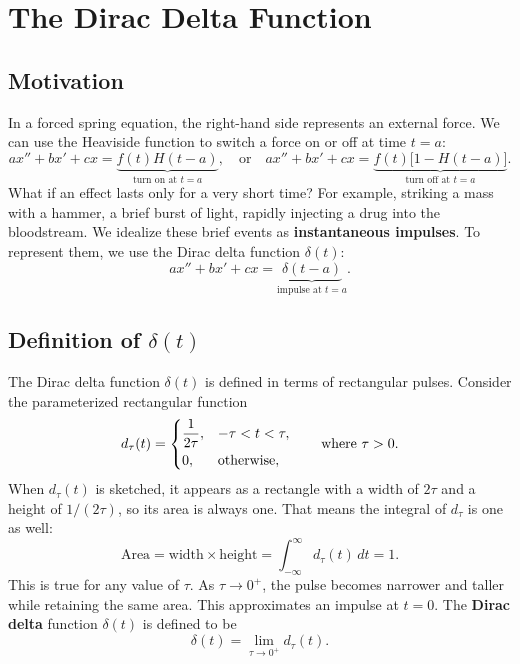 \documentclass[10pt,letterpaper]{article}
\begin{document}

\section{The Dirac Delta Function}

\subsection{Motivation}
In a forced spring equation, the right-hand side represents
an external force. We can use the Heaviside function to
switch a force on or off at time $t=a$:
\[
ax''+bx'+cx=
\underbrace{f(t)H(t-a)}_{\text{turn on at }t=a},
\quad \text{or}\quad
ax''+bx'+cx=
\underbrace{f(t)\bigl[1-H(t-a)\bigr]}_{\text{turn off at }t=a}.
\]
What if an effect lasts only for a very short time?
For example, striking a mass with a hammer, a brief burst of light, rapidly injecting a drug into the bloodstream. We idealize these brief events as
\textbf{instantaneous impulses}. To represent them,
we use the Dirac delta function $\delta(t)$:
\[
ax''+bx'+cx=
\underbrace{\delta(t-a)}_{\text{impulse at }t=a}.
\]

\subsection{Definition of $\delta(t)$}
The Dirac delta function $\delta(t)$ is defined in terms of rectangular pulses. Consider the parameterized rectangular function
\[
d_\tau(t)=
\begin{dcases}
\dfrac{1}{2\tau}, & -\tau<t<\tau,\\
0, & \text{otherwise},
\end{dcases}
\qquad \text{where }\tau>0.
\]
When $d_\tau(t)$ is sketched, it appears as a rectangle with a width of $2\tau$ and a height of $1/(2\tau)$, so its area is always one. That means the integral of $d_\tau$ is one as well:
\[\text{Area}=\text{width}\times\text{height}=
\int_{-\infty}^{\infty}d_\tau(t)\,dt
=1.
\]
This is true for any value of $\tau$.
As $\tau\to0^+$, the pulse becomes narrower and taller
while retaining the same area. This approximates an
impulse at $t=0$. The \textbf{Dirac delta} function $\delta(t)$ is defined to be 
$$
    \delta(t)=\lim_{\tau\to 0^+} d_{\tau}(t).
$$
\end{document}
